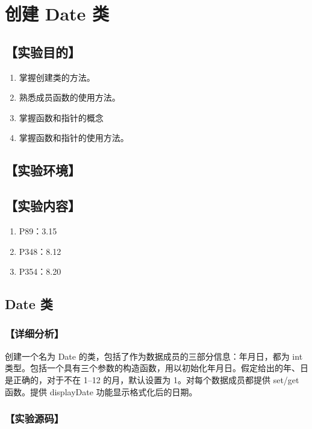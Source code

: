 \section{创建 Date 类}
\hfill{}
\subsection*{【实验目的】}
\begin{enumerate}[topsep=0pt,partopsep=0pt,itemsep=0pt,parsep=0pt,label={\arabic*、}]
\item 掌握创建类的方法。
\item 熟悉成员函数的使用方法。
\item 掌握函数和指针的概念
\item 掌握函数和指针的使用方法。
\end{enumerate}
\subsection*{【实验环境】}
\MyEnvironment
\subsection*{【实验内容】}
\begin{enumerate}[topsep=0pt,partopsep=0pt,itemsep=0pt,parsep=0pt,label={\arabic*、}]
\item P89：3.15
\item P348：8.12
\item P354：8.20
\end{enumerate}

\subsection{Date 类}
\subsubsection*{【详细分析】}
创建一个名为 Date 的类，包括了作为数据成员的三部分信息：年月日，都为 int 类型。包括一个具有三个参数的构造函数，用以初始化年月日。假定给出的年、日是正确的，对于不在 1--12 的月，默认设置为 1。对每个数据成员都提供 set/get 函数。提供 displayDate 功能显示格式化后的日期。
\subsubsection*{【实验源码】}
{\linespread{1}}
{\linespread{1}}
{\linespread{1}}
